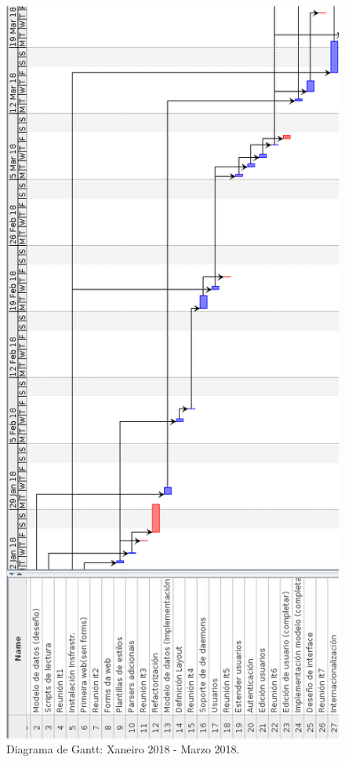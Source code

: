 \begin{figure}[H]
	\centering
	\includegraphics[scale=0.5,keepaspectratio=true]{./images/gantt/gantt2.png}
	\caption{Diagrama de Gantt: Xaneiro 2018 - Marzo 2018. }
	\label{fig:gantt2}
\end{figure}

